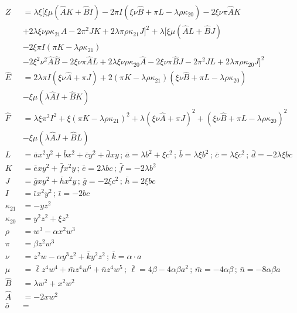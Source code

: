 \begin{align}
Z &= \lambda\xi [\xi \mu(\hat AK  + \hat BI )-2\pi I(\xi \nu \hat B + \pi L - \lambda \rho \kappa_{20})  -2\xi \nu \pi \hat A K \\
&+2 \lambda \xi \nu \rho \kappa_{21} \hat A -2  \pi^2 J K +2 \lambda \pi \rho \kappa_{21} J]^2 + \lambda [\xi \mu(\hat AL + \hat BJ) \\
&-2\xi \pi I(\pi K - \lambda \rho \kappa_{21})\\
&-2\xi^2 \nu^2 \hat A \hat B -2 \xi \nu \pi \hat A L +2 \lambda \xi \nu \rho \kappa_{20} \hat A-2 \xi \nu \pi \hat B J -2 \pi^2 J L +2 \lambda \pi \rho \kappa_{20} J]^2 \\
\hat E &= 2\lambda \pi I(\xi \nu \hat A + \pi J) + 2(\pi K - \lambda \rho \kappa_{21})(\xi \nu \hat B + \pi L - \lambda \rho \kappa_{20})  \\
&- \xi \mu (\lambda \hat AI  + \hat BK  )\\
\hat F &= \lambda\xi \pi^2 I^2 +\xi (\pi K - \lambda \rho \kappa_{21})^2 + \lambda (\xi \nu \hat A + \pi J)^2 + (\xi \nu \hat B + \pi L - \lambda \rho \kappa_{20})^2 \\
&- \xi \mu (\lambda \hat A J + \hat B L) \\
L &= \bar a x^2 y^2 + \bar b x^2 + \bar c y^2 + \bar d xy \,;\,\bar a = \lambda b^2 + \xi c^2\,;\,\bar b = \lambda \xi b^2\,;\,\bar c = \lambda \xi c^2\,;\,\bar d = -2 \lambda \xi bc \\
K &= \bar e xy^2 + \bar f x^2 y \,;\,\bar e = 2 \lambda bc \,;\,\bar f = -2\lambda b^2 \\
J &= \bar g xy^2 + \bar h x^2 y \,;\,\bar g = -2\xi c^2 \,;\,\bar h = 2\xi bc \\
I &= \bar \iota x^2 y^2 \,;\, \bar \iota = -2bc \\
\kappa_{21} &= -yz^2 \\
\kappa_{20} &= y^2 z^2 + \xi z^2\\
\rho &= w^3 - \alpha x^2 w^3\\
\pi &= \beta z^2w^3\\
\nu &= z^2 w - \alpha y^3 z^2 + \bar k y^2 z^2\,;\,\bar k = \alpha \cdot a\\
\mu &= \bar \ell z^4 w^4 + \bar m z^4 w^6 + \bar n z^4 w^5 \,;\,\bar \ell = 4\beta   -4\alpha\beta a^2 \,;\,\bar m = -4\alpha\beta \,;\,\bar n = - 8\alpha\beta a \\
\hat B &= \lambda w^2 + x^2 w^2\\
\hat A &= -2xw^2 \\
\bar o &=
\end{align}

